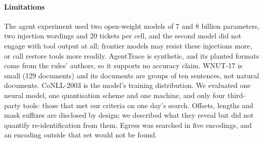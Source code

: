 \paragraph{Limitations} The agent experiment used two open-weight models of 7 and 8 billion parameters, two injection wordings and 20 tickets per cell, and the second model did not engage with tool output at all; frontier models may resist these injections more, or call restore tools more readily. AgentTrace is synthetic, and its planted formats come from the rules' authors, so it supports no accuracy claim. WNUT-17 is small (129 documents) and its documents are groups of ten sentences, not natural documents. CoNLL-2003 is the model's training distribution. We evaluated one neural model, one quantisation scheme and one machine, and only four third-party tools: those that met our criteria on one day's search. Offsets, lengths and mask suffixes are disclosed by design; we described what they reveal but did not quantify re-identification from them. Egress was searched in five encodings, and an encoding outside that set would not be found.
